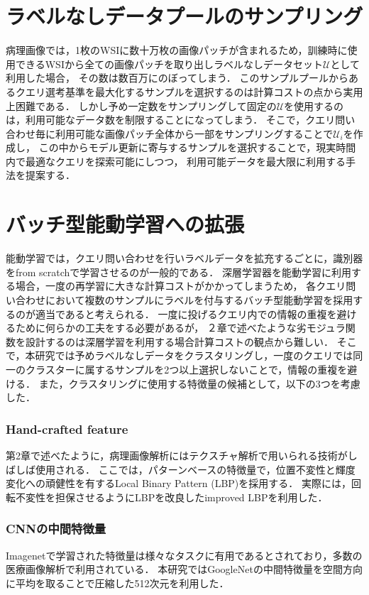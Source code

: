 \section{ラベルなしデータプールのサンプリング}
病理画像では，1枚のWSIに数十万枚の画像パッチが含まれるため，訓練時に使用できるWSIから全ての画像パッチを取り出しラベルなしデータセット$\mathcal{U}$として利用した場合，
その数は数百万にのぼってしまう．
このサンプルプールからあるクエリ選考基準を最大化するサンプルを選択するのは計算コストの点から実用上困難である．
しかし予め一定数をサンプリングして固定の$\mathcal{U}$を使用するのは，利用可能なデータ数を制限することになってしまう．
そこで，クエリ問い合わせ毎に利用可能な画像パッチ全体から一部をサンプリングすることで$\mathcal{U}_i$を作成し，
この中からモデル更新に寄与するサンプルを選択することで，現実時間内で最適なクエリを探索可能にしつつ，
利用可能データを最大限に利用する手法を提案する．

\section{バッチ型能動学習への拡張}
能動学習では，クエリ問い合わせを行いラベルデータを拡充するごとに，識別器をfrom scratchで学習させるのが一般的である．
深層学習器を能動学習に利用する場合，一度の再学習に大きな計算コストがかかってしまうため，
各クエリ問い合わせにおいて複数のサンプルにラベルを付与するバッチ型能動学習を採用するのが適当であると考えられる．
一度に投げるクエリ内での情報の重複を避けるために何らかの工夫をする必要があるが，
２章で述べたような劣モジュラ関数を設計するのは深層学習を利用する場合計算コストの観点から難しい．
そこで，本研究では予めラベルなしデータをクラスタリングし，一度のクエリでは同一のクラスターに属するサンプルを2つ以上選択しないことで，情報の重複を避ける．
また，クラスタリングに使用する特徴量の候補として，以下の3つを考慮した．

\subsubsection{Hand-crafted feature}
第2章で述べたように，病理画像解析にはテクスチャ解析で用いられる技術がしばしば使用される．
ここでは，パターンベースの特徴量で，位置不変性と輝度変化への頑健性を有するLocal Binary Pattern (LBP)\cite{ojala2002multiresolution}を採用する．
実際には，回転不変性を担保させるようにLBPを改良したimproved LBPを利用した．

\subsubsection{CNNの中間特徴量}
Imagenetで学習された特徴量は様々なタスクに有用であるとされており，多数の医療画像解析で利用されている．
本研究ではGoogleNet\cite{szegedy2015going}の中間特徴量を空間方向に平均を取ることで圧縮した512次元を利用した．


